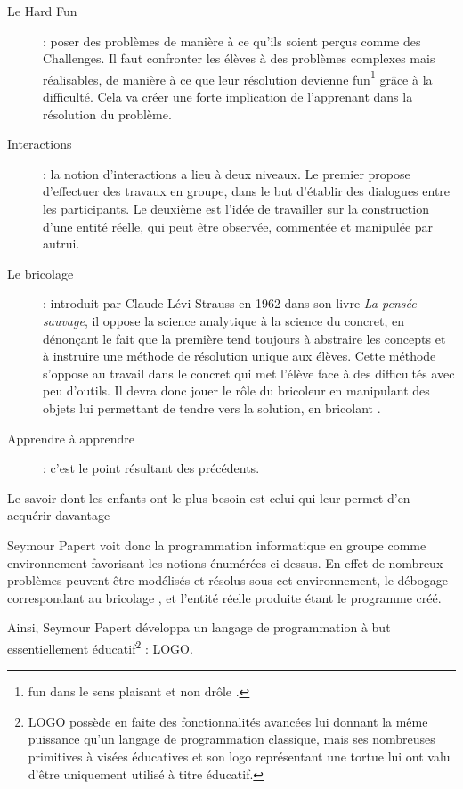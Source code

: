 \begin{description}
  \item[Le \og Hard Fun \fg{}] : poser des problèmes de manière à ce qu'ils soient perçus comme des Challenges. Il faut confronter les élèves à des problèmes complexes mais réalisables, de manière à ce que leur résolution devienne \og{}fun\fg{}\footnote{\og{}fun\fg{} dans le sens \og{}plaisant\fg{} et non \og drôle \fg{}.} grâce à la difficulté. Cela va créer une forte implication de l'apprenant dans la résolution du problème.
  \item[Interactions] : la notion d'interactions a lieu à deux niveaux. Le premier propose d'effectuer des travaux en groupe, dans le but d'établir des dialogues entre les participants. Le deuxième est l'idée de travailler sur la construction d'une entité réelle, qui peut être observée, commentée et manipulée par autrui.
  \item[Le \og bricolage \fg{}] : introduit par Claude Lévi-Strauss en 1962 dans son livre \emph{La pensée sauvage}, il oppose la science analytique à la science du concret, en dénonçant le fait que la première tend toujours à abstraire les concepts et à instruire une méthode de résolution unique aux élèves. Cette méthode s'oppose au travail dans le concret qui met l'élève face à des difficultés avec peu d'outils. Il devra donc jouer le rôle du \og bricoleur \fg{} en manipulant des objets lui permettant de tendre vers la solution, en \og bricolant \fg{}.
  \item[\og Apprendre à apprendre \fg{} ] : c'est le point résultant des précédents.
\end{description}

\cite{book_seymour_papert}

\begin{coolquote}
    Le savoir dont les enfants ont le plus besoin est celui qui leur permet d'en acquérir davantage
\end{coolquote}

Seymour Papert voit donc la programmation informatique en groupe comme environnement favorisant les notions énumérées ci-dessus\cite{wikipedia_papert}. En effet de nombreux problèmes peuvent être modélisés et résolus sous cet environnement, le débogage correspondant au \og bricolage \fg{}, et l'entité réelle produite étant le programme créé.

Ainsi, Seymour Papert développa un langage de programmation à but
essentiellement éducatif\footnote{LOGO possède en faite des
  fonctionnalités avancées lui donnant la même puissance qu'un langage
  de programmation \og{}classique\fg{}, mais ses nombreuses primitives
  à visées éducatives et son logo représentant une tortue lui ont valu
  d'être uniquement utilisé à titre éducatif.} : LOGO.

